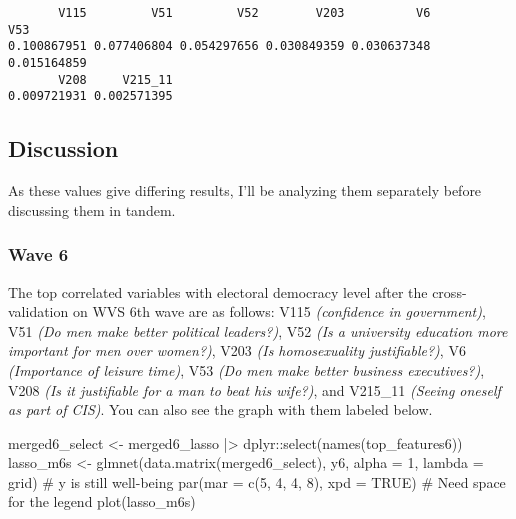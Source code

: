 \documentclass[
  letterpaper,
  DIV=11,
  numbers=noendperiod]{scrartcl}
\newenvironment{Shaded}{\begin{snugshade}}{\end{snugshade}}
\newcommand{\AttributeTok}[1]{\textcolor[rgb]{0.40,0.45,0.13}{#1}}
\newcommand{\CommentTok}[1]{\textcolor[rgb]{0.37,0.37,0.37}{#1}}
\newcommand{\ConstantTok}[1]{\textcolor[rgb]{0.56,0.35,0.01}{#1}}
\newcommand{\DecValTok}[1]{\textcolor[rgb]{0.68,0.00,0.00}{#1}}
\newcommand{\FunctionTok}[1]{\textcolor[rgb]{0.28,0.35,0.67}{#1}}
\newcommand{\NormalTok}[1]{\textcolor[rgb]{0.00,0.23,0.31}{#1}}
\newcommand{\OtherTok}[1]{\textcolor[rgb]{0.00,0.23,0.31}{#1}}
\newcommand{\SpecialCharTok}[1]{\textcolor[rgb]{0.37,0.37,0.37}{#1}}
\begin{document}
\begin{verbatim}
       V115         V51         V52        V203          V6         V53 
0.100867951 0.077406804 0.054297656 0.030849359 0.030637348 0.015164859 
       V208     V215_11 
0.009721931 0.002571395 
\end{verbatim}

\subsection{Discussion}\label{discussion}

As these values give differing results, I'll be analyzing them
separately before discussing them in tandem.

\subsubsection{Wave 6}\label{wave-6}

The top correlated variables with electoral democracy level after the
cross-validation on WVS 6th wave are as follows: V115 \emph{(confidence
in government)}, V51 \emph{(Do men make better political leaders?)}, V52
\emph{(Is a university education more important for men over women?)},
V203 \emph{(Is homosexuality justifiable?)}, V6 \emph{(Importance of
leisure time)}, V53 \emph{(Do men make better business executives?)},
V208 \emph{(Is it justifiable for a man to beat his wife?)}, and
V215\_11 \emph{(Seeing oneself as part of CIS)}. You can also see the
graph with them labeled below.

\begin{Shaded}
\begin{Highlighting}[]
\NormalTok{merged6\_select }\OtherTok{\textless{}{-}}\NormalTok{ merged6\_lasso }\SpecialCharTok{|\textgreater{}}\NormalTok{ dplyr}\SpecialCharTok{::}\FunctionTok{select}\NormalTok{(}\FunctionTok{names}\NormalTok{(top\_features6))}
\NormalTok{lasso\_m6s }\OtherTok{\textless{}{-}} \FunctionTok{glmnet}\NormalTok{(}\FunctionTok{data.matrix}\NormalTok{(merged6\_select), y6, }\AttributeTok{alpha =} \DecValTok{1}\NormalTok{, }\AttributeTok{lambda =}\NormalTok{ grid) }\CommentTok{\# y is still well{-}being}
\FunctionTok{par}\NormalTok{(}\AttributeTok{mar =} \FunctionTok{c}\NormalTok{(}\DecValTok{5}\NormalTok{, }\DecValTok{4}\NormalTok{, }\DecValTok{4}\NormalTok{, }\DecValTok{8}\NormalTok{), }\AttributeTok{xpd =} \ConstantTok{TRUE}\NormalTok{) }\CommentTok{\# Need space for the legend}
\FunctionTok{plot}\NormalTok{(lasso\_m6s)}
\end{Highlighting}
\end{Shaded}
\end{document}
